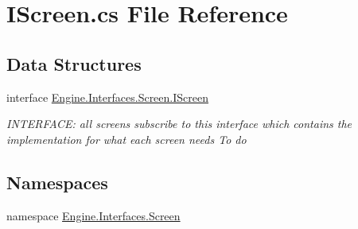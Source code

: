 \hypertarget{a00131}{}\section{I\+Screen.\+cs File Reference}
\label{a00131}
\subsection*{Data Structures}
\begin{DoxyCompactItemize}
\item 
interface \hyperlink{a00466}{Engine.\+Interfaces.\+Screen.\+I\+Screen}
\begin{DoxyCompactList}\small\item\em I\+N\+T\+E\+R\+F\+A\+CE\+: all screens subscribe to this interface which contains the implementation for what each screen needs To do \end{DoxyCompactList}\end{DoxyCompactItemize}
\subsection*{Namespaces}
\begin{DoxyCompactItemize}
\item 
namespace \hyperlink{a00263}{Engine.\+Interfaces.\+Screen}
\end{DoxyCompactItemize}
